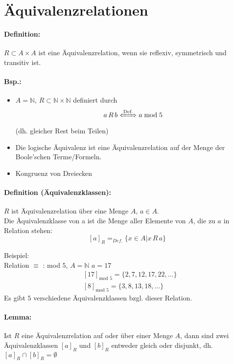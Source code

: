 %
\section{Äquivalenzrelationen}
\paragraph{Definition:} $R\subset A\times A$ ist eine Äquivalenzrelation, wenn sie reflexiv, symmetrisch und transitiv ist.

\paragraph{Bsp.:}
\begin{itemize}
\item $A=\mathbb{N}$, $R\subset\mathbb{N}\times\mathbb{N}$ definiert durch
\[
a\,R\,b \xLeftrightarrow{\text{Def.}} a\bmod 5
\]
(dh. gleicher Rest beim Teilen)
\item Die logische Äquivalenz ist eine Äquivalenzrelation auf der Menge der Boole'schen Terme/Formeln.
\item Kongruenz von Dreiecken
\end{itemize}

\paragraph{Definition (Äquivalenzklassen):}$R$ ist \"Aquivalenzrelation \"uber eine Menge $A$, $a\in A$.\\
Die \"Aquivalenzklasse von a ist die Menge aller Elemente von $A$, die zu $a$ in Relation stehen:
\[
[a]_{R} =_{Def.} \{x \in A | x\,R\,a\}
\]

Beispiel:\\
Relation $\equiv$ : mod $5$, $A = \mathbb{N}$ $a=17$
\begin{align*}
&[17]_{\text{mod }5} = \{2,7,12,17,22,...\} \\
&[8]_{\text{mod }5} = \{3,8,13,18, \ldots\}
\end{align*}
Es gibt $5$ verschiedene \"Aquivalenzklassen bzgl. dieser Relation.

\paragraph{Lemma: } Ist $R$ eine \"Aquivalenzrelation auf oder \"uber einer Menge $A$, dann sind zwei \"Aquivalenzklassen $[a]_R$ und $[b]_R$ entweder gleich oder disjunkt, dh. $[a]_R \cap [b]_R = \emptyset$

